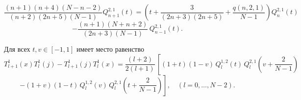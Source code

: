 \documentclass[12pt]{book}
\begin{document}
\begin{equation*}
  \frac{(n+1)(n+4)(N-n-2)}{(n+2)(2n+5)(N-1)} Q^{2,1}_{n+1}(t) =
  \left(t+\frac{3}{(2n+3)(2n+5)}+\frac{q(n,2,1)}{N-1}\right) Q^{2,1}_{n}(t)
\end{equation*}
\begin{equation}\label{35}
  - \frac{(n+1)(N+n+2)}{(2n+3)(N-1)} \, Q^{2,1}_{n-1}(t).
\end{equation}





\begin{lemma}\label{lemma0}
Для всех $t,v \in [-1,1]$ имеет место равенство
\begin{equation*}
  T_{l+1}^1(x) T_{l}^1(j) - T_{l+1}^1(j) T_{l}^1(x) =
    \frac{(l+2)}{2(l+1)} \,
  \left[
    (1+t)(1-v)\,Q^{1,2}_{l}(t)\,Q^{2,1}_{l}\left(v+\frac{2}{N-1}\right)
  \right.
\end{equation*}
\begin{equation}\label{lem0eq}
  \left.
  - (1+v)(1-t)\,Q^{1,2}_{l}(v)\,Q^{2,1}_{l}\left(t+\frac{2}{N-1}\right)\right],
  \quad (l=0, \ldots, N-2).
\end{equation}

\end{lemma}
\end{document}
